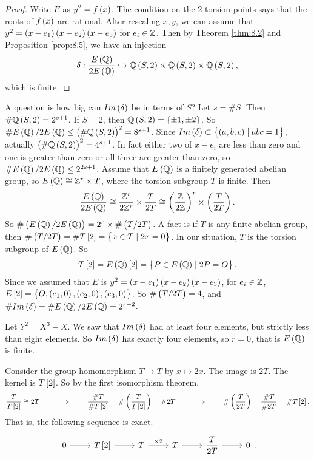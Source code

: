 \begin{proof}
Write $ E $ as $ y^2 = f\br{x} $. The condition on the $ 2 $-torsion points says that the roots of $ f\br{x} $ are rational. After rescaling $ x, y $, we can assume that $ y^2 = \br{x - e_1}\br{x - e_2}\br{x - e_3} $ for $ e_i \in \mathbb{Z} $. Then by Theorem \ref{thm:8.2} and Proposition \ref{prop:8.5}, we have an injection
$$ \delta : \dfrac{E\br{\Q}}{2E\br{\Q}} \hookrightarrow \Q\br{S, 2} \times \Q\br{S, 2} \times \Q\br{S, 2}, $$
which is finite.
\end{proof}

A question is how big can $ Im\br{\delta} $ be in terms of $ S $? Let $ s = \#S $. Then $ \#\Q\br{S, 2} = 2^{s + 1} $. If $ S = 2 $, then $ \Q\br{S, 2} = \cbr{\pm 1, \pm 2} $. So $ \#E\br{\Q} / 2E\br{\Q} \le \br{\#\Q\br{S, 2}}^2 = 8^{s + 1} $. Since $ Im\br{\delta} \subset \cbr{\br{a, b, c} \mid abc = 1} $, actually $ \br{\#\Q\br{S, 2}}^2 = 4^{s + 1} $. In fact either two of $ x - e_i $ are less than zero and one is greater than zero or all three are greater than zero, so $ \#E\br{\Q} / 2E\br{\Q} \le 2^{2s + 1} $. Assume that $ E\br{\Q} $ is a finitely generated abelian group, so $ E\br{\Q} \cong \Z^r \times T $, where the torsion subgroup $ T $ is finite. Then
$$ \dfrac{E\br{\Q}}{2E\br{\Q}} \cong \dfrac{\Z^r}{2\Z^r} \times \dfrac{T}{2T} \cong \br{\dfrac{\Z}{2\Z}}^r \times \br{\dfrac{T}{2T}}. $$
So $ \#\br{E\br{\Q} / 2E\br{\Q}} = 2^r \times \#\br{T / 2T} $. A fact is if $ T $ is any finite abelian group, then $ \#\br{T / 2T} = \#T\sbr{2} = \cbr{x \in T \mid 2x = 0} $. In our situation, $ T $ is the torsion subgroup of $ E\br{\Q} $. So
$$ T\sbr{2} = E\br{\Q}\sbr{2} = \cbr{P \in E\br{\Q} \mid 2P = O}. $$
Since we assumed that $ E $ is $ y^2 = \br{x - e_1}\br{x - e_2}\br{x - e_3} $, for $ e_i \in \mathbb{Z} $, $ E\sbr{2} = \cbr{O, \br{e_1, 0}, \br{e_2, 0}, \br{e_3, 0}} $. So $ \#\br{T / 2T} = 4 $, and $ \#Im\br{\delta} = \#E\br{\Q} / 2E\br{\Q} = 2^{r + 2} $.

\begin{example*}
Let $ Y^2 = X^3 - X $. We saw that $ Im\br{\delta} $ had at least four elements, but strictly less than eight elements. So $ Im\br{\delta} $ has exactly four elements, so $ r = 0 $, that is $ E\br{\Q} $ is finite.
\end{example*}

\pagebreak

Consider the group homomorphism $ T \mapsto T $ by $ x \mapsto 2x $. The image is $ 2T $. The kernel is $ T\sbr{2} $. So by the first isomorphism theorem,
$$ \dfrac{T}{T\sbr{2}} \cong 2T \qquad \implies \qquad \dfrac{\#T}{\#T\sbr{2}} = \#\br{\dfrac{T}{T\sbr{2}}} = \#2T \qquad \implies \qquad \#\br{\dfrac{T}{2T}} = \dfrac{\#T}{\#2T} = \#T\sbr{2}. $$
That is, the following sequence is exact.
$$
\begin{tikzcd}
0 \arrow{r} & T\sbr{2} \arrow{r} & T \arrow{r}{\times 2} & T \arrow{r} & \dfrac{T}{2T} \arrow{r} & 0
\end{tikzcd}.
$$

